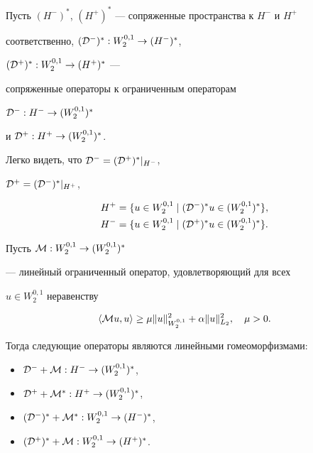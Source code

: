 Пусть $(H^-)^*$, $(H^+)^*$ --- сопряженные пространства к $H^-$ и $H^+$


соответственно, $({\cal D}^-)^*: W_2^{0,1} \to (H^-)^*$,


$({\cal D}^+)^*: W_2^{0,1} \to (H^+)^*$ ---


сопряженные операторы к ограниченным операторам


${\cal D}^- : H^- \to (W_2^{0,1})^*$


и $ {\cal D}^+ : H^+ \to (W_2^{0,1})^*$.


Легко видеть, что $ {\cal D}^- = ( {\cal D}^+)^*|_{H^-}$, 


$ {\cal D}^+ = ( {\cal D}^-)^*|_{H^+}$,


\begin{align*}


H^+&=\{ u\in W_2^{0,1} \mid ({\cal D}^-)^*u \in (W_2^{0,1})^*\},\\


%


H^-&=\{ u\in W_2^{0,1} \mid ({\cal D}^+)^*u \in (W_2^{0,1})^*\}.


\end{align*}





\begin{prop}


Пусть ${\cal M}: W_2^{0,1}\to (W_2^{0,1})^*$


--- линейный ограниченный оператор, удовлетворяющий для всех 


$u \in W_2^{0,1}$ неравенству


\begin{equation}


\la{\cal M}u,u\ra\geq \mu\|u\|^2_{W_2^{0,1}}+\alpha


\|u\|^2_{L_2},\quad \mu>0.


\label{2.3}


\end{equation} 


Тогда следующие операторы являются линейными гомеоморфизмами$:$


\begin{itemize}


\item[1.] ${\cal D}^-+{\cal M}: H^-\to (W_2^{0,1})^* $,


\item[2.] ${\cal D}^++{\cal M}^*: H^+\to (W_2^{0,1})^*$,


\item[3.] $({\cal D}^-)^*+{\cal M}^*: W_2^{0,1} \to (H^-)^*$,


\item[4.] $({\cal D}^+)^*+{\cal M}: W_2^{0,1} \to (H^+)^*$.


\end{itemize}


\end{prop}





